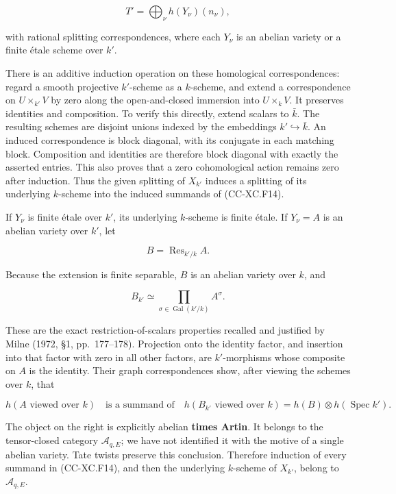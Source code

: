 \[
 T'=\bigoplus_\nu h(Y_\nu)(n_\nu),
 \tag{CC-XC.F14}
\]

with rational splitting correspondences, where each \(Y_\nu\) is an
abelian variety or a finite étale scheme over \(k'\).

There is an additive induction operation on these homological
correspondences: regard a smooth projective \(k'\)-scheme as a
\(k\)-scheme, and extend a correspondence on \(U\times_{k'}V\) by zero
along the open-and-closed immersion into \(U\times_kV\). It preserves
identities and composition. To verify this directly, extend scalars to
\(\bar k\). The resulting schemes are disjoint unions indexed by the
embeddings \(k'\hookrightarrow\bar k\). An induced correspondence is
block diagonal, with its conjugate in each matching block. Composition
and identities are therefore block diagonal with exactly the asserted
entries. This also proves that a zero cohomological action remains zero
after induction. Thus the given splitting of \(X_{k'}\) induces a
splitting of its underlying \(k\)-scheme into the induced summands of
(CC-XC.F14).

If \(Y_\nu\) is finite étale over \(k'\), its underlying \(k\)-scheme is
finite étale. If \(Y_\nu=A\) is an abelian variety over \(k'\), let

\[
 B=\operatorname{Res}_{k'/k}A.
\]

Because the extension is finite separable, \(B\) is an abelian variety
over \(k\), and

\[
 B_{k'}\simeq
 \prod_{\sigma\in\operatorname{Gal}(k'/k)} A^\sigma .
 \tag{CC-XC.F15}
\]

These are the exact restriction-of-scalars properties recalled and
justified by Milne (1972, §1, pp.~177--178). Projection onto the
identity factor, and insertion into that factor with zero in all other
factors, are \(k'\)-morphisms whose composite on \(A\) is the identity.
Their graph correspondences show, after viewing the schemes over \(k\),
that

\[
 h(A\text{ viewed over }k)
 \quad\text{is a summand of}\quad
 h(B_{k'}\text{ viewed over }k)
 =h(B)\otimes h(\operatorname{Spec}k').
 \tag{CC-XC.F16}
\]

The object on the right is explicitly abelian \textbf{times Artin}. It
belongs to the tensor-closed category \(\mathcal A_{q,E}\); we have not
identified it with the motive of a single abelian variety. Tate twists
preserve this conclusion. Therefore induction of every summand in
(CC-XC.F14), and then the underlying \(k\)-scheme of \(X_{k'}\), belong
to \(\mathcal A_{q,E}\).

